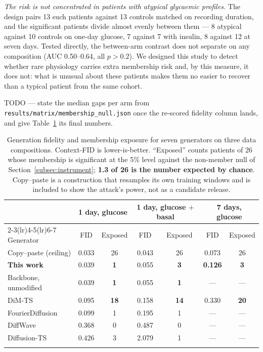 \documentclass[pdflatex,sn-nature]{sn-jnl}
\theoremstyle{thmstyleone}
\begin{document}
\emph{The risk is not concentrated in patients with atypical glycaemic
profiles.} The design pairs 13 such patients against 13 controls matched on
recording duration, and the significant patients divide almost evenly between
them --- 8 atypical against 10 controls on one-day glucose, 7 against 7 with
insulin, 8 against 12 at seven days. Tested directly, the between-arm contrast
does not separate on any composition (AUC 0.50--0.64, all $p > 0.2$). We
designed this study to detect whether rare physiology carries extra membership
risk and, by this measure, it does not: what is unusual about these patients
makes them no easier to recover than a typical patient from the same cohort.

TODO --- state the median gaps per arm from
\texttt{results/matrix/membership\_null.json} once the re-scored fidelity column
lands, and give Table~\ref{tab:benchmark} its final numbers.

\begin{table}[t]
\caption{Generation fidelity and membership exposure for seven generators on
three data compositions. Context-FID is lower-is-better. ``Exposed'' counts
patients of 26 whose membership is significant at the 5\% level against the
non-member null of Section~\ref{subsec:instrument}; \textbf{1.3 of 26 is the
number expected by chance}. Copy--paste is a construction that resamples its own
training windows and is included to show the attack's power, not as a candidate
release.}\label{tab:benchmark}
\begin{tabular}{@{}lcccccc@{}}
\toprule
& \multicolumn{2}{c}{1 day, glucose}
& \multicolumn{2}{c}{1 day, glucose $+$ basal}
& \multicolumn{2}{c}{7 days, glucose} \\
\cmidrule(lr){2-3}\cmidrule(lr){4-5}\cmidrule(lr){6-7}
Generator & FID & Exposed & FID & Exposed & FID & Exposed \\
\midrule
Copy--paste (ceiling)  & 0.033 & 26 & 0.043 & 26 & 0.073 & 26 \\
\textbf{This work}     & 0.039 & \textbf{1} & 0.055 & \textbf{3} & \textbf{0.126} & \textbf{3} \\
Backbone, unmodified   & 0.039 & \textbf{1} & 0.055 & \textbf{1} & --- & --- \\
DiM-TS                 & 0.095 & \textbf{18} & 0.158 & \textbf{14} & 0.330 & \textbf{20} \\
FourierDiffusion       & 0.099 & 1  & 0.195 & 1  & ---   & --- \\
DiffWave               & 0.368 & 0  & 0.487 & 0  & ---   & --- \\
Diffusion-TS           & 0.426 & 3  & 2.079 & 1  & ---   & --- \\
\botrule
\end{tabular}
\end{table}
\end{document}
